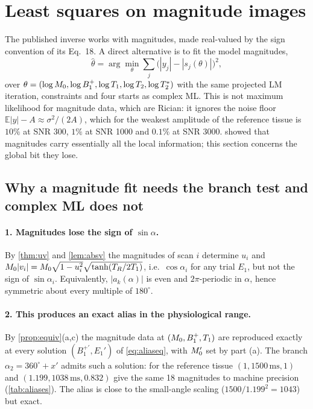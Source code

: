 \section{Least squares on magnitude images}\label{sec:magnitude}

The published inverse works with magnitudes, made real-valued by the sign convention of its
Eq.~18. A direct alternative is to fit the model magnitudes,
\begin{equation}
  \hat\theta=\arg\min_\theta\sum_j\bigl(|y_j|-|s_j(\theta)|\bigr)^2,
  \label{eq:magls}
\end{equation}
over $\theta=(\log M_0,\log B_1^{+},\log T_1,\log T_2,\log T_2^{*})$ with the same projected LM iteration,
constraints and four starts as complex ML. This is not maximum likelihood for magnitude data,
which are Rician: it ignores the noise floor $\mathbb E|y|-A\approx\sigma^2/(2A)$, which for the weakest
amplitude of the reference tissue is $10\%$ at SNR 300, $1\%$ at SNR 1000 and $0.1\%$ at SNR 3000.
 showed that magnitudes carry essentially all the local information; this
section concerns the global bit they lose.

\subsection{Why a magnitude fit needs the branch test and complex ML does not}

\paragraph{1. Magnitudes lose the sign of $\sin\alpha$.} By \cref{thm:uv} and \cref{lem:absv}
the magnitudes of scan $i$ determine $u_i$ and $M_0|v_i|=M_0\sqrt{1-u_i^2}\sqrt{\tanh(T_R/2T_1)}$, i.e.\
$\cos\alpha_i$ for any trial $E_1$, but not the sign of $\sin\alpha_i$. Equivalently, $|a_k(\alpha)|$ is
even and $2\pi$-periodic in $\alpha$, hence symmetric about every multiple of $180^\circ$.

\paragraph{2. This produces an exact alias in the physiological range.} By
\cref{prop:equiv}(a,c) the magnitude data at $(M_0,B_1^{+},T_1)$ are reproduced exactly at every
solution $(B_1^{+\prime},E_1')$ of \eqref{eq:aliaseq}, with $M_0'$ set by part (a). The branch
$\alpha_2=360^\circ+x'$ admits such a solution: for the reference tissue $(1,1500\,\mathrm{ms},1)$ and
$(1.199,1038\,\mathrm{ms},0.832)$ give the same 18 magnitudes to machine precision
(\cref{tab:aliases}). The alias is close to the small-angle scaling
($1500/1.199^2=1043$) but exact.

